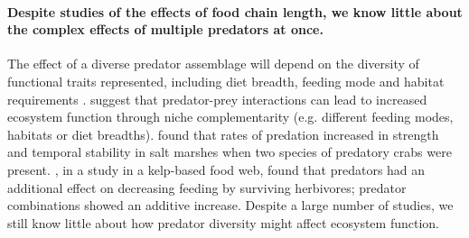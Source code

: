\documentclass[10pt]{article}
\begin{document}
\begin{spacing}{2}

\paragraph{Despite studies of the effects of food chain length, we know little
about the complex effects of multiple predators at once.}%
The effect of a diverse predator assemblage will depend on the
diversity of functional traits represented, including diet breadth,
feeding mode and habitat requirements
\citep{Schmitz2009}. \citet{Ives2005} suggest that predator-prey
interactions can lead to increased ecosystem function through niche
complementarity (e.g. different feeding modes, habitats or diet
breadths). \citet{Griffin2011} found that rates of predation increased
in strength and temporal stability in salt marshes when two species of
predatory crabs were present. \citet{Byrnes2006}, in a study in a
kelp-based food web, found that predators had an additional effect on
decreasing feeding by surviving herbivores; predator combinations
showed an additive increase.  Despite a large number of studies, we
still know little about how predator diversity might affect ecosystem
function.


\end{spacing}
\end{document}
